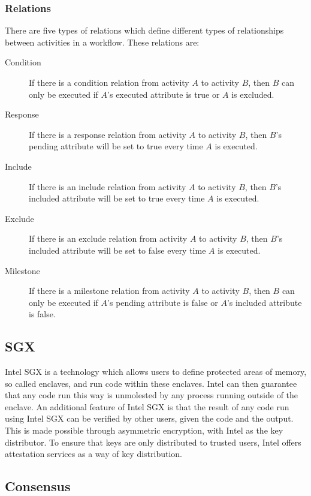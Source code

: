 \documentclass{article}
\begin{document}
		\subsubsection{Relations}

		There are five types of relations which define different types of relationships between activities in a workflow. 
		These relations are:

		\begin{description}
			\item[Condition] If there is a condition relation from activity $A$ to activity $B$, then $B$ can only be executed if $A$'s executed attribute is true or $A$ is excluded.
			\item[Response] If there is a response relation from activity $A$ to activity $B$, then $B$'s pending attribute will be set to true every time $A$ is executed.
			\item[Include] If there is an include relation from activity $A$ to activity $B$, then $B$'s included attribute will be set to true every time $A$ is executed.
			\item[Exclude] If there is an exclude relation from activity $A$ to activity $B$, then $B$'s included attribute will be set to false every time $A$ is executed.
			\item[Milestone] If there is a milestone relation from activity $A$ to activity $B$, then $B$ can only be executed if $A$'s pending attribute is false or $A$'s included attribute is false.
		\end{description}

		\subsection{SGX}

		Intel SGX is a technology which allows users to define protected areas of memory, so called enclaves, and run code within these enclaves.
		Intel can then guarantee that any code run this way is unmolested by any process running outside of the enclave.
		An additional feature of Intel SGX is that the result of any code run using Intel SGX can be verified by other users, given the code and the output.
		This is made possible through asymmetric encryption, with Intel as the key distributor.
		To ensure that keys are only distributed to trusted users, Intel offers attestation services as a way of key distribution.

		\subsection{Consensus}
\end{document}
